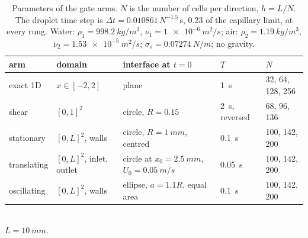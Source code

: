 \documentclass[preprint,3p,11pt]{elsarticle}
\begin{document}
\begin{table}[tp]
  \centering
  \caption{Parameters of the gate arms. $N$ is the number of cells per direction,
    $h=L/N$. The droplet time step is $\Delta t=0.010861\,N^{-1.5}$\,s, 0.23 of the
    capillary limit, at every rung. Water: $\rho_1=\SI{998.2}{kg/m^3}$,
    $\nu_1=\SI{1e-6}{m^2/s}$; air: $\rho_2=\SI{1.19}{kg/m^3}$, $\nu_2=\SI{1.53e-5}{m^2/s}$;
    $\sigma_s=\SI{0.07274}{N/m}$; no gravity.}
  \label{tab:cases}
  \small
  \begin{tabular}{@{}lllll@{}}
    \toprule
    arm & domain & interface at $t=0$ & $T$ & $N$\\
    \midrule
    exact 1D & $x\in[-2,2]$ & plane & \SI{1}{s} & 32, 64, 128, 256\\
    shear & $[0,1]^2$ & circle, $R=0.15$ & \SI{2}{s}, reversed & 68, 96, 136\\
    stationary & $[0,L]^2$, walls & circle, $R=\SI{1}{mm}$, centred & \SI{0.1}{s} & 100, 142, 200\\
    translating & $[0,L]^2$, inlet, outlet & circle at $x_0=\SI{2.5}{mm}$, $U_0=\SI{0.05}{m/s}$ & \SI{0.05}{s} & 100, 142, 200\\
    oscillating & $[0,L]^2$, walls & ellipse, $a=1.1R$, equal area & \SI{0.1}{s} & 100, 142, 200\\
    \bottomrule
  \end{tabular}\\[3pt]
  {\footnotesize $L=\SI{10}{mm}$.}
\end{table}
\end{document}
